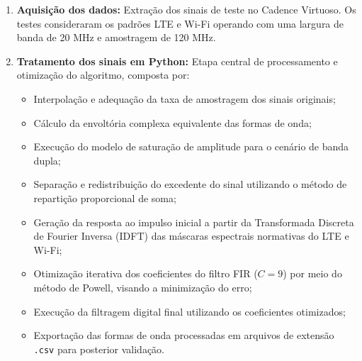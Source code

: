 \begin{enumerate}
	\item \textbf{Aquisição dos dados:} Extração dos sinais de teste no Cadence Virtuoso. Os testes consideraram os padrões LTE e Wi-Fi operando com uma largura de banda de 20 MHz e amostragem de 120 MHz.
	
\item \textbf{Tratamento dos sinais em Python:} Etapa central de processamento e otimização do algoritmo, composta por:
\begin{itemize}
	\item Interpolação e adequação da taxa de amostragem dos sinais originais;
	\item Cálculo da envoltória complexa equivalente das formas de onda;
	\item Execução do modelo de saturação de amplitude para o cenário de banda dupla;
	\item Separação e redistribuição do excedente do sinal utilizando o método de repartição proporcional de soma;
	\item Geração da resposta ao impulso inicial a partir da Transformada Discreta de Fourier Inversa (IDFT) das máscaras espectrais normativas do LTE e Wi-Fi;
	\item Otimização iterativa dos coeficientes do filtro FIR ($C=9$) por meio do método de Powell, visando a minimização do erro;
	\item Execução da filtragem digital final utilizando os coeficientes otimizados;
	\item Exportação das formas de onda processadas em arquivos de extensão \texttt{.csv} para posterior validação.
\end{itemize}
	
\end{enumerate}